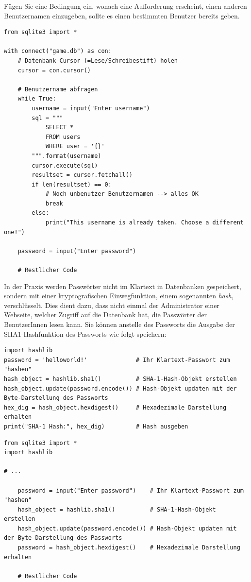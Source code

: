 \begin{mychallenge}
Fügen Sie eine Bedingung ein, wonach eine Aufforderung erscheint, einen anderen Benutzernamen einzugeben, sollte es einen bestimmten Benutzer bereits geben.
\begin{myanswer}
\begin{lstlisting}
from sqlite3 import *

with connect("game.db") as con:
    # Datenbank-Cursor (=Lese/Schreibestift) holen
    cursor = con.cursor()

    # Benutzername abfragen
    while True:
        username = input("Enter username")
        sql = """
            SELECT * 
            FROM users
            WHERE user = '{}'
        """.format(username)
        cursor.execute(sql)
        resultset = cursor.fetchall()
        if len(resultset) == 0:
            # Noch unbenutzer Benutzernamen --> alles OK
            break
        else:
            print("This username is already taken. Choose a different one!")
    
    password = input("Enter password")

    # Restlicher Code

\end{lstlisting}
\end{myanswer}
\end{mychallenge}

\begin{mychallenge}
In der Praxis werden Passwörter nicht im Klartext in Datenbanken gespeichert, sondern mit einer kryptografischen Einwegfunktion, einem sogenannten \textit{hash}, verschlüsselt. Dies dient dazu, dass nicht einmal der Administrator einer Webseite, welcher Zugriff auf die Datenbank hat, die Passwörter der BenutzerInnen lesen kann. Sie können anstelle des Passworts die Ausgabe der SHA1-Hashfunktion des Passworts wie folgt speichern:
\begin{lstlisting}
import hashlib
password = 'helloworld!'              # Ihr Klartext-Passwort zum "hashen"
hash_object = hashlib.sha1()          # SHA-1-Hash-Objekt erstellen
hash_object.update(password.encode()) # Hash-Objekt updaten mit der Byte-Darstellung des Passworts
hex_dig = hash_object.hexdigest()     # Hexadezimale Darstellung erhalten
print("SHA-1 Hash:", hex_dig)         # Hash ausgeben

\end{lstlisting}
\begin{myanswer}
\begin{lstlisting}
from sqlite3 import *
import hashlib

# ...

    password = input("Enter password")    # Ihr Klartext-Passwort zum "hashen"
    hash_object = hashlib.sha1()          # SHA-1-Hash-Objekt erstellen
    hash_object.update(password.encode()) # Hash-Objekt updaten mit der Byte-Darstellung des Passworts
    password = hash_object.hexdigest()    # Hexadezimale Darstellung erhalten

    # Restlicher Code
\end{lstlisting}
\end{myanswer}
\end{mychallenge}

